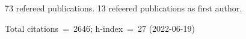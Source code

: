 73 refereed publications. 13 refeered publications as first author.

Total citations~=~2646; h-index~=~27 (2022-06-19)